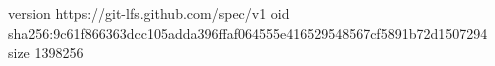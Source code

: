 version https://git-lfs.github.com/spec/v1
oid sha256:9c61f866363dcc105adda396ffaf064555e416529548567cf5891b72d1507294
size 1398256
